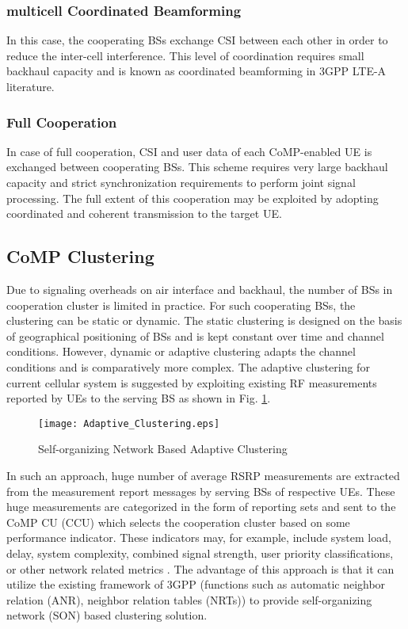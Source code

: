 \documentclass[article,10pt,twocolumn]{IEEEtran}
\begin{document}
\subsubsection{multicell Coordinated Beamforming}
In this case, the cooperating BSs exchange CSI between each other in order to reduce the inter-cell interference. This level of coordination requires small backhaul capacity and is known as coordinated beamforming in 3GPP LTE-A literature.
\subsubsection{Full Cooperation}
In case of full cooperation, CSI and user data of each CoMP-enabled UE is exchanged between cooperating BSs. This scheme requires very large backhaul capacity and strict synchronization requirements to perform joint signal processing. The full extent of this cooperation may be exploited by adopting coordinated and coherent transmission to the target UE.
\subsection{CoMP Clustering}\label{sec:comp_clustering}
Due to signaling overheads on air interface and backhaul, the number of BSs in cooperation cluster is limited in practice. For such cooperating BSs, the clustering can be static or dynamic. The static clustering is designed on the basis of geographical positioning of BSs and is kept constant over time and channel conditions. However, dynamic or adaptive clustering adapts the channel conditions and is comparatively more complex. The adaptive clustering for current cellular system is suggested by exploiting existing RF measurements reported by UEs to the serving BS \citep{garavaglia_adaptive_2014} as shown in Fig. \ref{Figure:adaptive_clustering}. 
\begin{figure}[!htb]
\centering
  \texttt{[image: Adaptive\_Clustering.eps]}
  \caption{Self-organizing Network Based Adaptive Clustering}\label{Figure:adaptive_clustering}
\end{figure}

In such an approach, huge number of average RSRP measurements are extracted from the measurement report messages by serving BSs of respective UEs. These huge measurements are categorized in the form of reporting sets and sent to the CoMP CU (CCU) which selects the cooperation cluster based on some performance indicator. These indicators may, for example, include system load, delay, system complexity, combined signal strength, user priority classifications, or other network related metrics \citep{garavaglia_adaptive_2014}. The advantage of this approach is that it can utilize the existing framework of 3GPP (functions such as automatic neighbor relation (ANR), neighbor relation tables (NRTs)) to provide self-organizing network (SON) based clustering solution.
\end{document}
